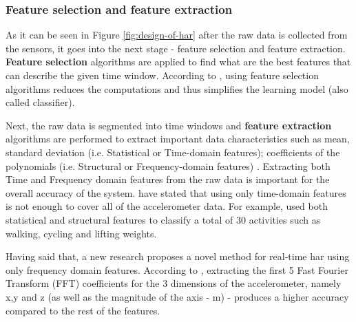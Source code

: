         \subsubsection{Feature selection and feature extraction }
        \label{section:feature-selection&extraction}
        As it can be seen in Figure \ref{fig:design-of-har} after the raw data is collected from the sensors, it goes into the next stage - feature selection and feature extraction. \textbf{Feature selection} algorithms are applied to find what are the best features that can describe the given time window. According to \citet[21-22]{labrador2013}, using feature selection algorithms reduces the computations and thus simplifies the learning model (also called classifier). 
        
        Next, the raw data is segmented into time windows \citep[2]{capela2016} and \textbf{feature extraction} algorithms are performed to extract important data characteristics such as mean, standard deviation (i.e. Statistical or Time-domain features); coefficients of the polynomials (i.e. Structural or Frequency-domain features) \citep[722]{lara2012a}. Extracting both Time and Frequency domain features from the raw data is important for the overall accuracy of the system. \citet[269]{wang2015} have stated that using only time-domain features is not enough to cover all of the accelerometer data. For example, \citet[]{tapia2007} used both statistical and structural features to classify a total of 30 activities such as walking, cycling and lifting weights.
        
        Having said that, a new research proposes a novel method for real-time \gls{har} using only frequency domain features. According to \citet[3]{lee2016}, extracting the first 5 Fast Fourier Transform (FFT) coefficients for the 3 dimensions of the accelerometer, namely x,y and z (as well as the magnitude of the axis - m) - produces a higher accuracy compared to the rest of the features.
        
